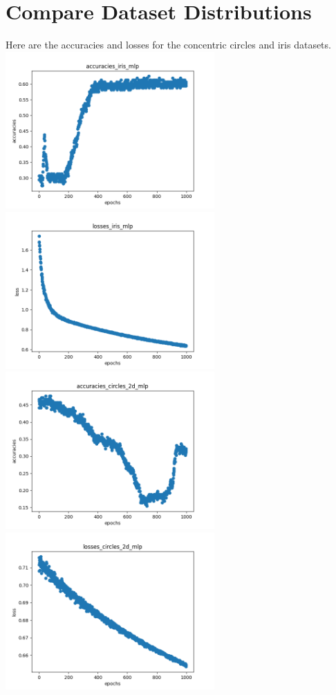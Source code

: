 \documentclass{article}
\begin{document}
\section{Compare Dataset Distributions}
Here are the accuracies and losses for the concentric circles and iris datasets. \\
\includegraphics[width=8cm]{accuracies_iris_mlp}
\includegraphics[width=8cm]{losses_iris_mlp}
\\
\includegraphics[width=8cm]{accuracies_circles_2d_mlp}
\includegraphics[width=8cm]{losses_circles_2d_mlp}
\end{document}
